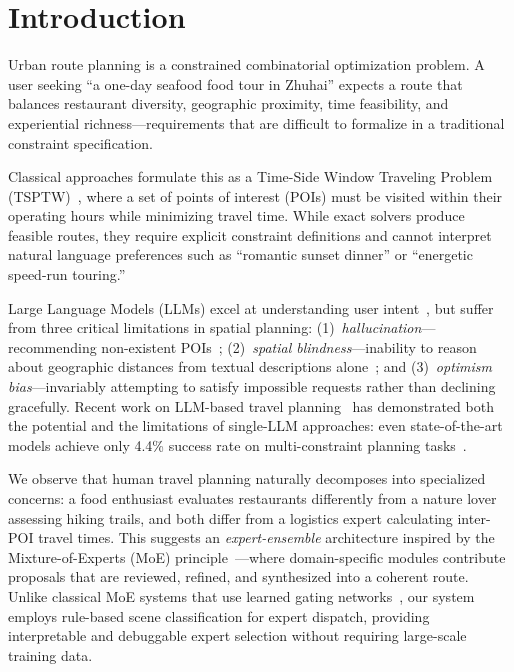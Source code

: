 \section{Introduction}
\label{sec:introduction}

Urban route planning is a constrained combinatorial optimization problem. A user seeking ``a one-day seafood food tour in Zhuhai'' expects a route that balances restaurant diversity, geographic proximity, time feasibility, and experiential richness---requirements that are difficult to formalize in a traditional constraint specification.

Classical approaches formulate this as a Time-Side Window Traveling Problem (TSPTW)~\cite{solomon1987algorithms}, where a set of points of interest (POIs) must be visited within their operating hours while minimizing travel time. While exact solvers produce feasible routes, they require explicit constraint definitions and cannot interpret natural language preferences such as ``romantic sunset dinner'' or ``energetic speed-run touring.''

Large Language Models (LLMs) excel at understanding user intent~\cite{wei2022chain}, but suffer from three critical limitations in spatial planning: (1)~\textit{hallucination}---recommending non-existent POIs~\cite{ji2023survey}; (2)~\textit{spatial blindness}---inability to reason about geographic distances from textual descriptions alone~\cite{gong2024spatial}; and (3)~\textit{optimism bias}---invariably attempting to satisfy impossible requests rather than declining gracefully. Recent work on LLM-based travel planning~\cite{chen2024travelagent,han2024travelplanner} has demonstrated both the potential and the limitations of single-LLM approaches: even state-of-the-art models achieve only 4.4\% success rate on multi-constraint planning tasks~\cite{han2024travelplanner}.

We observe that human travel planning naturally decomposes into specialized concerns: a food enthusiast evaluates restaurants differently from a nature lover assessing hiking trails, and both differ from a logistics expert calculating inter-POI travel times. This suggests an \textit{expert-ensemble} architecture inspired by the Mixture-of-Experts (MoE) principle~\cite{shazeer2017outrageously,jiang2024mixtral}---where domain-specific modules contribute proposals that are reviewed, refined, and synthesized into a coherent route. Unlike classical MoE systems that use learned gating networks~\cite{fedus2022switch}, our system employs rule-based scene classification for expert dispatch, providing interpretable and debuggable expert selection without requiring large-scale training data.

